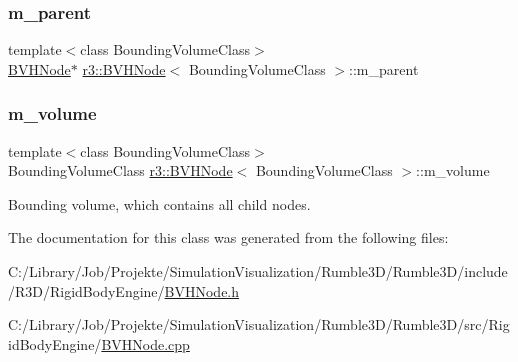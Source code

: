 \subsubsection{\texorpdfstring{m\+\_\+parent}{m\_parent}}
{\footnotesize\ttfamily template$<$class Bounding\+Volume\+Class$>$ \\
\mbox{\hyperlink{classr3_1_1_b_v_h_node}{B\+V\+H\+Node}}$\ast$ \mbox{\hyperlink{classr3_1_1_b_v_h_node}{r3\+::\+B\+V\+H\+Node}}$<$ Bounding\+Volume\+Class $>$\+::m\+\_\+parent\hspace{0.3cm}{\ttfamily [protected]}}

\mbox{\label{classr3_1_1_b_v_h_node_a114366b1f5cbb56f6f650f9c794258a7}} 
\subsubsection{\texorpdfstring{m\+\_\+volume}{m\_volume}}
{\footnotesize\ttfamily template$<$class Bounding\+Volume\+Class$>$ \\
Bounding\+Volume\+Class \mbox{\hyperlink{classr3_1_1_b_v_h_node}{r3\+::\+B\+V\+H\+Node}}$<$ Bounding\+Volume\+Class $>$\+::m\+\_\+volume\hspace{0.3cm}{\ttfamily [protected]}}



Bounding volume, which contains all child nodes. 



The documentation for this class was generated from the following files\+:\begin{DoxyCompactItemize}
\item 
C\+:/\+Library/\+Job/\+Projekte/\+Simulation\+Visualization/\+Rumble3\+D/\+Rumble3\+D/include/\+R3\+D/\+Rigid\+Body\+Engine/\mbox{\hyperlink{_b_v_h_node_8h}{B\+V\+H\+Node.\+h}}\item 
C\+:/\+Library/\+Job/\+Projekte/\+Simulation\+Visualization/\+Rumble3\+D/\+Rumble3\+D/src/\+Rigid\+Body\+Engine/\mbox{\hyperlink{_b_v_h_node_8cpp}{B\+V\+H\+Node.\+cpp}}\end{DoxyCompactItemize}
